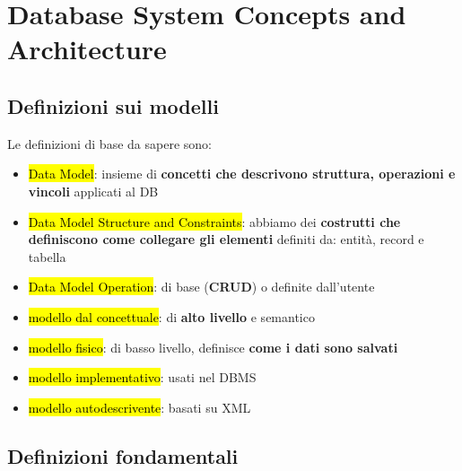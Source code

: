 \newpage
\section{Database System Concepts and Architecture}

\subsection{Definizioni sui modelli}

Le definizioni di base da sapere sono:

\begin{itemize}
	\item \hl{Data Model}: insieme di \textbf{concetti che descrivono struttura, operazioni e vincoli} applicati al DB
	
	\item \hl{Data Model Structure and Constraints}: abbiamo dei \textbf{costrutti che definiscono come collegare gli elementi} definiti da: entità, record e tabella

	\item \hl{Data Model Operation}: di base (\textbf{CRUD}) o definite dall'utente

	\item \hl{modello dal concettuale}: di \textbf{alto livello} e semantico
	
	\item \hl{modello fisico}: di basso livello, definisce \textbf{come i dati sono salvati}
	
	\item \hl{modello implementativo}: usati nel DBMS 
	
	\item \hl{modello autodescrivente}: basati su XML 

\end{itemize}


\subsection{Definizioni fondamentali}

